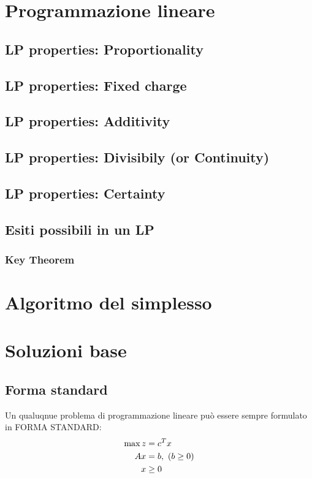 \documentclass[a4paper, 11pt]{article}
\begin{document}
        

    \section{Programmazione lineare}
        \subsection{LP properties: Proportionality}
        \subsection{LP properties: Fixed charge}
        \subsection{LP properties: Additivity}
        \subsection{LP properties: Divisibily (or Continuity)}
        \subsection{LP properties: Certainty}
        \subsection{Esiti possibili in un LP}
        \subsubsection{Key Theorem}
    \section{Algoritmo del simplesso}   
    
    



    \section{Soluzioni base}
        \subsection{Forma standard}
            Un qualuqnue problema di programmazione lineare può essere sempre formulato in FORMA STANDARD:
            \begin{align}
               \max{z} &= c^{T}x \notag \\
                Ax &= b, \text{ ($b \geq 0$)} \notag \\
                x & \geq 0 \notag 
            \end{align}
\end{document}
